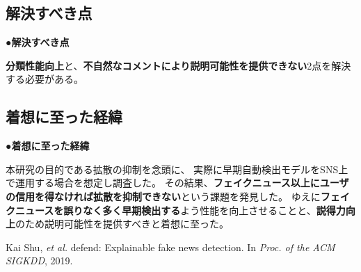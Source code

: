 {	\subsection{解決すべき点}
	\noindent
	●\textbf{解決すべき点}

	\textbf{分類性能向上}と、\textbf{不自然なコメントにより説明可能性を提供できない}2点を解決する必要がある。

	\subsection{着想に至った経緯}
	\noindent
	●\textbf{着想に至った経緯}

	本研究の目的である拡散の抑制を念頭に、
	実際に早期自動検出モデルをSNS上で運用する場合を想定し調査した。
	その結果、\textbf{フェイクニュース以上にユーザの信用を得なければ拡散を抑制できない}という課題を発見した。
	ゆえに\textbf{フェイクニュースを誤りなく多く早期検出する}よう性能を向上させることと、\textbf{説得力向上}のため説明可能性を提供すべきと着想に至った。

	{\footnotesize
		\begin{thebibliography}{99}
			\vspace*{-1mm}
			\setlength{\parskip}{0cm}
			\setlength{\itemsep}{0cm}
			\setcounter{enumiv}{6}
			\begin{spacing}{0.7}
				 Kai Shu, \textit{et al.} defend: Explainable fake news detection. In \textit{Proc. of the ACM SIGKDD}, 2019.
			\end{spacing}
			\end{thebibliography}
			
	}
}

